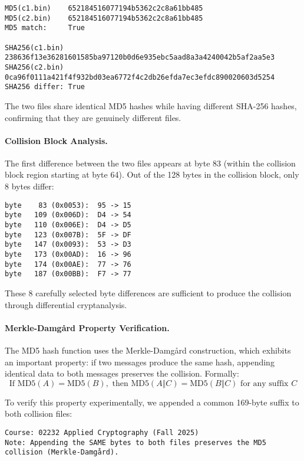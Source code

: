 \documentclass[runningheads]{llncs}
\begin{document}
    \begin{lstlisting}[style=hashblock,caption={MD5/SHA-256 of the binary collision pair},label={lst:ipc-binary}]
MD5(c1.bin)    652184516077194b5362c2c8a61bb485
MD5(c2.bin)    652184516077194b5362c2c8a61bb485
MD5 match:     True

SHA256(c1.bin) 238636f13e36281601585ba97120b0d6e935ebc5aad8a3a4240042b5af2aa5e3
SHA256(c2.bin) 0ca96f0111a421f4f932bd03ea6772f4c2db26efda7ec3efdc890020603d5254
SHA256 differ: True
    \end{lstlisting}

    The two files share identical MD5 hashes while having different SHA-256 hashes, confirming that they are genuinely different files.

    \paragraph{Collision Block Analysis.}
    The first difference between the two files appears at byte 83 (within the collision block region starting at byte 64). Out of the 128 bytes in the collision block, only 8 bytes differ:

    \begin{lstlisting}[style=textblock,caption={Differing bytes in collision blocks},label={lst:ipc-diffs}]
byte    83 (0x0053):  95 -> 15
byte   109 (0x006D):  D4 -> 54
byte   110 (0x006E):  D4 -> D5
byte   123 (0x007B):  5F -> DF
byte   147 (0x0093):  53 -> D3
byte   173 (0x00AD):  16 -> 96
byte   174 (0x00AE):  77 -> 76
byte   187 (0x00BB):  F7 -> 77
    \end{lstlisting}

    These 8 carefully selected byte differences are sufficient to produce the collision through differential cryptanalysis.

    \paragraph{Merkle-Damgård Property Verification.}
    The MD5 hash function uses the Merkle-Damgård construction, which exhibits an important property: if two messages produce the same hash, appending identical data to both messages preserves the collision. Formally:
    \[
        \text{If } \mathrm{MD5}(A) = \mathrm{MD5}(B), \text{ then } \mathrm{MD5}(A\Vert C) = \mathrm{MD5}(B\Vert C) \text{ for any suffix } C
    \]

    To verify this property experimentally, we appended a common 169-byte suffix to both collision files:
    \begin{lstlisting}[style=textblock]
Course: 02232 Applied Cryptography (Fall 2025)
Note: Appending the SAME bytes to both files preserves the MD5 collision (Merkle-Damgård).
    \end{lstlisting}
\end{document}
